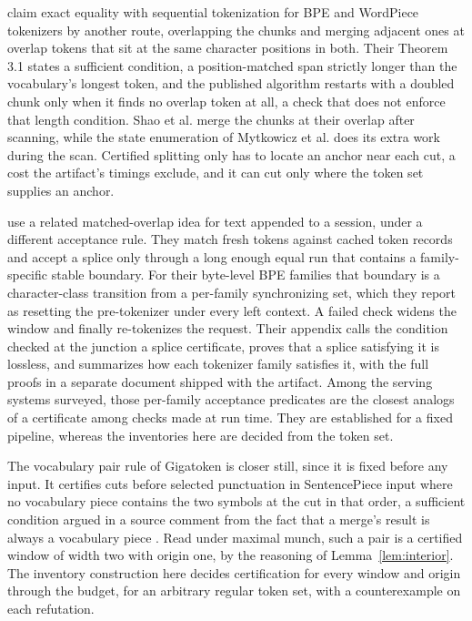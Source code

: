 \documentclass[11pt,a4paper]{article}
\theoremstyle{definition}
\theoremstyle{plain}
\begin{document}
\citet{shao2026lopt} claim exact equality with sequential tokenization for BPE and WordPiece tokenizers by another
route, overlapping the chunks and merging adjacent ones at overlap tokens that sit at the same character positions in
both. Their Theorem 3.1 states a sufficient condition, a position-matched span strictly longer than the vocabulary's
longest token, and the published algorithm restarts with a doubled chunk only when it finds no overlap token at all, a
check that does not enforce that length condition. Shao et al. merge the chunks at their overlap after scanning, while
the state enumeration of Mytkowicz et al. does its extra work during the scan. Certified splitting only has to locate an
anchor near each cut, a cost the artifact's timings exclude, and it can cut only where the token set supplies an anchor.

\citet{zhang2026toktier} use a related matched-overlap idea for text appended to a session, under a different acceptance
rule. They match fresh tokens against cached token records and accept a splice only through a long enough equal run that
contains a family-specific stable boundary. For their byte-level BPE families that boundary is a character-class
transition from a per-family synchronizing set, which they report as resetting the pre-tokenizer under every left
context. A failed check widens the window and finally re-tokenizes the request. Their appendix calls the condition
checked at the junction a splice certificate, proves that a splice satisfying it is lossless, and summarizes how each
tokenizer family satisfies it, with the full proofs in a separate document shipped with the artifact. Among the serving
systems surveyed, those per-family acceptance predicates are the closest analogs of a certificate among checks made at
run time. They are established for a fixed pipeline, whereas the inventories here are decided from the token set.

The vocabulary pair rule of Gigatoken is closer still, since it is fixed before any input. It certifies cuts before
selected punctuation in SentencePiece input where no vocabulary piece contains the two symbols at the cut in that order,
a sufficient condition argued in a source comment from the fact that a merge's result is always a vocabulary piece
\citep{rod2026gigatoken}. Read under maximal munch, such a pair is a certified window of width two with origin one, by
the reasoning of Lemma~\ref{lem:interior}. The inventory construction here decides certification for every window and
origin through the budget, for an arbitrary regular token set, with a counterexample on each refutation.
\end{document}
